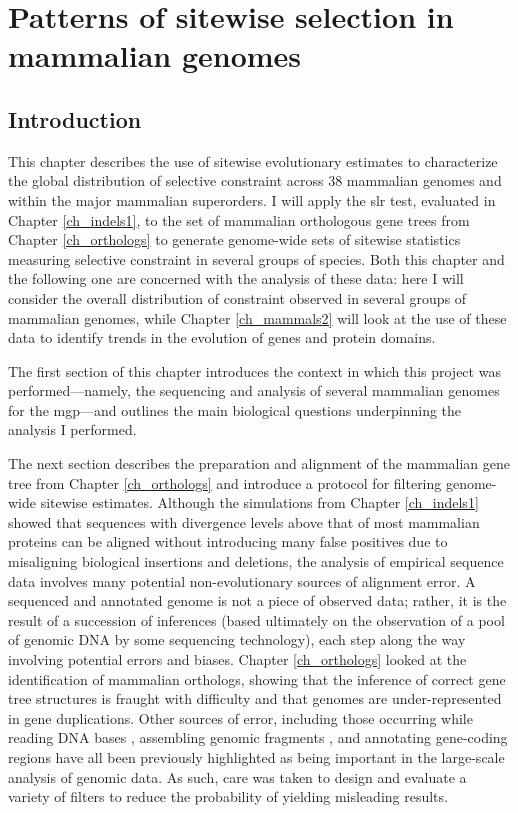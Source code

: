 \chapter{Patterns of sitewise selection in mammalian genomes}
\label{ch_mammals1}
\acresetall

\section{Introduction}

This chapter describes the use of sitewise evolutionary estimates to
characterize the global distribution of selective constraint across 38
mammalian genomes and within the major mammalian superorders. I will
apply the \ac{slr} test, evaluated in Chapter \ref{ch_indels1}, to the
set of mammalian orthologous gene trees from Chapter
\ref{ch_orthologs} to generate genome-wide sets of sitewise statistics
measuring selective constraint in several groups of \mammln
species. Both this chapter and the following one are concerned with
the analysis of these data: here I will consider the overall
distribution of constraint observed in several groups of mammalian
genomes, while Chapter \ref{ch_mammals2} will look at the use of these
\sw data to identify trends in the evolution of genes and protein
domains.

The first section of this chapter introduces the context in which this
project was performed---namely, the sequencing and analysis of several
mammalian genomes for the \ac{mgp}---and outlines the main biological
questions underpinning the \sw analysis I performed.

The next section describes the preparation and alignment of the
mammalian gene tree from Chapter \ref{ch_orthologs} and introduce a
protocol for filtering genome-wide sitewise estimates. Although the
simulations from Chapter \ref{ch_indels1} showed that sequences with
divergence levels above that of most mammalian proteins can be aligned
without introducing many false positives due to misaligning biological
insertions and deletions, the analysis of empirical sequence data
involves many potential non-evolutionary sources of alignment error. A
sequenced and annotated genome is not a piece of observed data;
rather, it is the result of a succession of inferences (based
ultimately on the observation of a pool of genomic DNA by some
sequencing technology), each step along the way involving potential
errors and biases. Chapter \ref{ch_orthologs} looked at the
identification of mammalian orthologs, showing that the inference of
correct gene tree structures is fraught with difficulty and that \lcv
genomes are under-represented in gene duplications. Other sources of
error, including those occurring while reading DNA bases \citep{TODO},
assembling genomic fragments \citep{TODO}, and annotating gene-coding
regions \citep{TODO} have all been previously highlighted as being
important in the large-scale analysis of genomic data. As such, care
was taken to design and evaluate a variety of filters to reduce the
probability of yielding misleading results.

